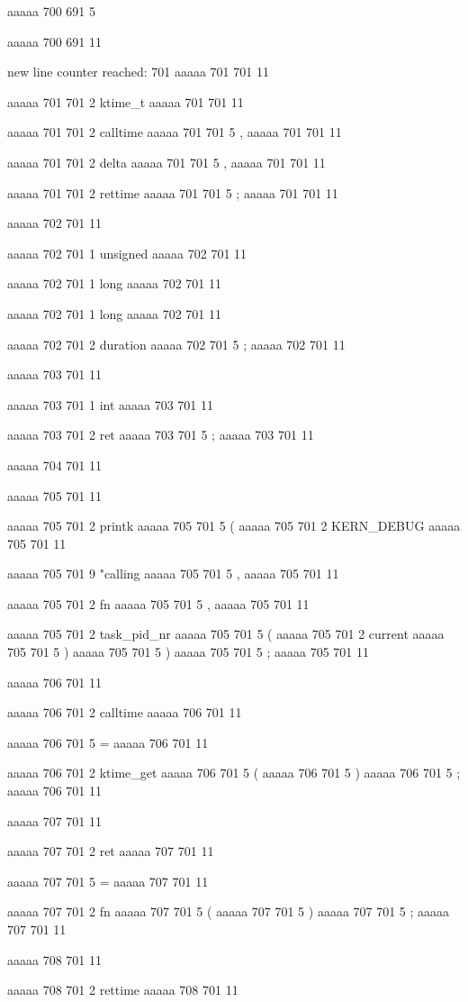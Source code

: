 aaaaa 700 691
5
{
aaaaa 700 691
11


new line counter reached: 701
aaaaa 701 701
11
	
aaaaa 701 701
2
ktime_t
aaaaa 701 701
11
 
aaaaa 701 701
2
calltime
aaaaa 701 701
5
,
aaaaa 701 701
11
 
aaaaa 701 701
2
delta
aaaaa 701 701
5
,
aaaaa 701 701
11
 
aaaaa 701 701
2
rettime
aaaaa 701 701
5
;
aaaaa 701 701
11


aaaaa 702 701
11
	
aaaaa 702 701
1
unsigned
aaaaa 702 701
11
 
aaaaa 702 701
1
long
aaaaa 702 701
11
 
aaaaa 702 701
1
long
aaaaa 702 701
11
 
aaaaa 702 701
2
duration
aaaaa 702 701
5
;
aaaaa 702 701
11


aaaaa 703 701
11
	
aaaaa 703 701
1
int
aaaaa 703 701
11
 
aaaaa 703 701
2
ret
aaaaa 703 701
5
;
aaaaa 703 701
11


aaaaa 704 701
11


aaaaa 705 701
11
	
aaaaa 705 701
2
printk
aaaaa 705 701
5
(
aaaaa 705 701
2
KERN_DEBUG
aaaaa 705 701
11
 
aaaaa 705 701
9
"calling  %
aaaaa 705 701
5
,
aaaaa 705 701
11
 
aaaaa 705 701
2
fn
aaaaa 705 701
5
,
aaaaa 705 701
11
 
aaaaa 705 701
2
task_pid_nr
aaaaa 705 701
5
(
aaaaa 705 701
2
current
aaaaa 705 701
5
)
aaaaa 705 701
5
)
aaaaa 705 701
5
;
aaaaa 705 701
11


aaaaa 706 701
11
	
aaaaa 706 701
2
calltime
aaaaa 706 701
11
 
aaaaa 706 701
5
=
aaaaa 706 701
11
 
aaaaa 706 701
2
ktime_get
aaaaa 706 701
5
(
aaaaa 706 701
5
)
aaaaa 706 701
5
;
aaaaa 706 701
11


aaaaa 707 701
11
	
aaaaa 707 701
2
ret
aaaaa 707 701
11
 
aaaaa 707 701
5
=
aaaaa 707 701
11
 
aaaaa 707 701
2
fn
aaaaa 707 701
5
(
aaaaa 707 701
5
)
aaaaa 707 701
5
;
aaaaa 707 701
11


aaaaa 708 701
11
	
aaaaa 708 701
2
rettime
aaaaa 708 701
11
 
}
